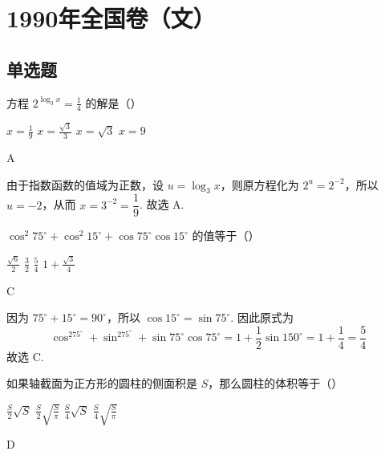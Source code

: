 \chapter{1990年全国卷（文）}
\section{单选题}

\begin{problem}
方程 \(2^{\log_3 x}=\frac{1}{4}\) 的解是（\quad）

\choices
    {\(x=\frac{1}{9}\)}
    {\(x=\frac{\sqrt{3}}{3}\)}
    {\(x=\sqrt{3}\)}
    {\(x=9\)}
\end{problem}

\begin{answer}A\end{answer}

\begin{solution}
由于指数函数的值域为正数，设 \(u=\log_3x\)，则原方程化为 \(2^u=2^{-2}\)，所以 \(u=-2\)，从而 \(x=3^{-2}=\dfrac{1}{9}\). 故选 A.
\end{solution}


\begin{problem}
\(\cos^2 75^\circ+\cos^2 15^\circ+\cos 75^\circ \cos 15^\circ\) 的值等于（\quad）

\choices
    {\(\frac{\sqrt{6}}{2}\)}
    {\(\frac{3}{2}\)}
    {\(\frac{5}{4}\)}
    {\(1+\frac{\sqrt{3}}{4}\)}
\end{problem}

\begin{answer}C\end{answer}

\begin{solution}
因为 \(75^\circ+15^\circ=90^\circ\)，所以 \(\cos15^\circ=\sin75^\circ\). 因此原式为
\[
\cos^275^\circ+\sin^275^\circ+\sin75^\circ\cos75^\circ=1+\frac{1}{2}\sin150^\circ=1+\frac14=\frac54
\]
故选 C.
\end{solution}


\begin{problem}
如果轴截面为正方形的圆柱的侧面积是 \(S\)，那么圆柱的体积等于（\quad）

\choices
    {\(\frac{S}{2}\sqrt{S}\)}
    {\(\frac{S}{2}\sqrt{\frac{S}{\pi}}\)}
    {\(\frac{S}{4}\sqrt{S}\)}
    {\(\frac{S}{4}\sqrt{\frac{S}{\pi}}\)}
\end{problem}

\begin{answer}D\end{answer}

